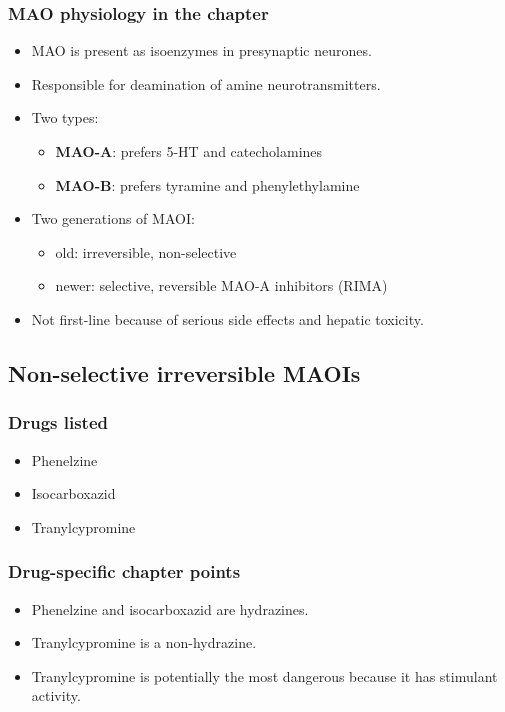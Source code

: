 \documentclass[11pt,a4paper]{article}
\begin{document}
\subsubsection{MAO physiology in the chapter}
\begin{itemize}
  \item MAO is present as isoenzymes in presynaptic neurones.
  \item Responsible for deamination of amine neurotransmitters.
  \item Two types:
  \begin{itemize}
    \item \textbf{MAO-A}: prefers 5-HT and catecholamines
    \item \textbf{MAO-B}: prefers tyramine and phenylethylamine
  \end{itemize}
  \item Two generations of MAOI:
  \begin{itemize}
    \item old: irreversible, non-selective
    \item newer: selective, reversible MAO-A inhibitors (RIMA)
  \end{itemize}
  \item Not first-line because of serious side effects and hepatic toxicity.
\end{itemize}

\subsection{Non-selective irreversible MAOIs}

\subsubsection{Drugs listed}
\begin{itemize}
  \item Phenelzine
  \item Isocarboxazid
  \item Tranylcypromine
\end{itemize}

\subsubsection{Drug-specific chapter points}
\begin{itemize}
  \item Phenelzine and isocarboxazid are hydrazines.
  \item Tranylcypromine is a non-hydrazine.
  \item Tranylcypromine is potentially the most dangerous because it has stimulant activity.
\end{itemize}
\end{document}
